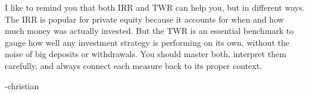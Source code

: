 \begin{infobox}

I like to remind you that both IRR and TWR can help you, but in different ways. The IRR is popular for private equity because it accounts for when and how much money was actually invested. But the TWR is an essential benchmark to gauge how well any investment strategy is performing on its own, without the noise of big deposits or withdrawals. You should master both, interpret them carefully, and always connect each measure back to its proper context.

-christian

\end{infobox}